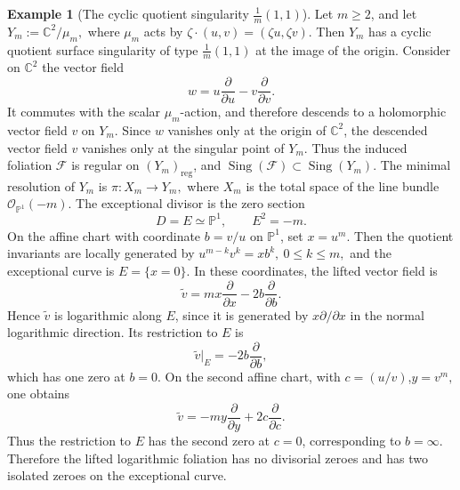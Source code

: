 \documentclass[12pt,reqno,a4paper]{amsart}
\numberwithin{equation}{section}
\theoremstyle{plain}
\theoremstyle{definition}
\newtheorem{example}[example]{Example}
\DeclareMathOperator{\Sing}{Sing}
\begin{document}
\begin{example}[The cyclic quotient singularity \(\frac{1}{m}(1,1)\)]
Let \(m\geq 2\), and let
$
Y_m:=\mathbb C^2/\mu_m,
$
where \(\mu_m\) acts by
$
\zeta\cdot(u,v)=(\zeta u,\zeta v).
$
Then \(Y_m\) has a cyclic quotient surface singularity of type
\(\frac{1}{m}(1,1)\) at the image of the origin.
Consider on \(\mathbb C^2\) the vector field
\[
w=u\frac{\partial}{\partial u}
-
v\frac{\partial}{\partial v}.
\]
It commutes with the scalar \(\mu_m\)-action, and therefore descends to a
holomorphic vector field \(v\) on \(Y_m\). Since \(w\) vanishes only at the
origin of \(\mathbb C^2\), the descended vector field \(v\) vanishes only at the
singular point of \(Y_m\). Thus the induced foliation \(\mathcal F\) is regular
on \((Y_m)_{\mathrm{reg}}\), and
$
\Sing(\mathcal F)\subset \Sing(Y_m).
$
The minimal resolution of \(Y_m\) is
$
\pi:X_m\to Y_m,
$
where \(X_m\) is the total space of the line bundle
\(\mathcal O_{\mathbb P^1}(-m)\). The exceptional divisor is the zero section
\[
D=E\simeq\mathbb P^1,
\qquad
E^2=-m.
\]
On the affine chart with coordinate
$
b=v/u
$
on \(\mathbb P^1\), set
$
x=u^m.
$
Then the quotient invariants are locally generated by
$
u^{m-k}v^k=x b^k,\ 
0\leq k\leq m,
$
and the exceptional curve is \(E=\{x=0\}\). In these coordinates, the lifted
vector field is
\[
\widetilde v
=
m x\frac{\partial}{\partial x}
-
2b\frac{\partial}{\partial b}.
\]
Hence \(\widetilde v\) is logarithmic along \(E\), since it is generated by
\(x\partial/\partial x\) in the normal logarithmic direction. Its restriction to
\(E\) is
\[
\widetilde v|_E
=
-2b\frac{\partial}{\partial b},
\]
which has one zero at \(b=0\).
On the second affine chart, with
$
c= (u/v)
$,$
y=v^m,
$
one obtains
\[
\widetilde v
=
-m y\frac{\partial}{\partial y}
+
2c\frac{\partial}{\partial c}.
\]
Thus the restriction to \(E\) has the second zero at \(c=0\), corresponding to
\(b=\infty\). Therefore the lifted logarithmic foliation has no divisorial
zeroes and has two isolated zeroes on the exceptional curve.


\end{example}
\end{document}
